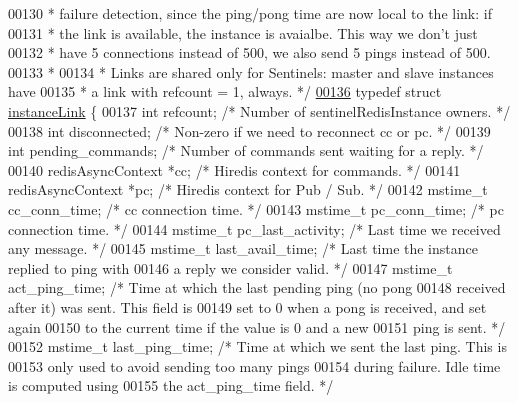 \begin{DoxyCode}
00130 \textcolor{comment}{ * failure detection, since the ping/pong time are now local to the link: if}
00131 \textcolor{comment}{ * the link is available, the instance is avaialbe. This way we don't just}
00132 \textcolor{comment}{ * have 5 connections instead of 500, we also send 5 pings instead of 500.}
00133 \textcolor{comment}{ *}
00134 \textcolor{comment}{ * Links are shared only for Sentinels: master and slave instances have}
00135 \textcolor{comment}{ * a link with refcount = 1, always. */}
\hyperlink{structinstanceLink}{00136} \textcolor{keyword}{typedef} \textcolor{keyword}{struct} \hyperlink{structinstanceLink}{instanceLink} \{
00137     \textcolor{keywordtype}{int} refcount;          \textcolor{comment}{/* Number of sentinelRedisInstance owners. */}
00138     \textcolor{keywordtype}{int} disconnected;      \textcolor{comment}{/* Non-zero if we need to reconnect cc or pc. */}
00139     \textcolor{keywordtype}{int} pending\_commands;  \textcolor{comment}{/* Number of commands sent waiting for a reply. */}
00140     redisAsyncContext *cc; \textcolor{comment}{/* Hiredis context for commands. */}
00141     redisAsyncContext *pc; \textcolor{comment}{/* Hiredis context for Pub / Sub. */}
00142     mstime\_t cc\_conn\_time; \textcolor{comment}{/* cc connection time. */}
00143     mstime\_t pc\_conn\_time; \textcolor{comment}{/* pc connection time. */}
00144     mstime\_t pc\_last\_activity; \textcolor{comment}{/* Last time we received any message. */}
00145     mstime\_t last\_avail\_time; \textcolor{comment}{/* Last time the instance replied to ping with}
00146 \textcolor{comment}{                                 a reply we consider valid. */}
00147     mstime\_t act\_ping\_time;   \textcolor{comment}{/* Time at which the last pending ping (no pong}
00148 \textcolor{comment}{                                 received after it) was sent. This field is}
00149 \textcolor{comment}{                                 set to 0 when a pong is received, and set again}
00150 \textcolor{comment}{                                 to the current time if the value is 0 and a new}
00151 \textcolor{comment}{                                 ping is sent. */}
00152     mstime\_t last\_ping\_time;  \textcolor{comment}{/* Time at which we sent the last ping. This is}
00153 \textcolor{comment}{                                 only used to avoid sending too many pings}
00154 \textcolor{comment}{                                 during failure. Idle time is computed using}
00155 \textcolor{comment}{                                 the act\_ping\_time field. */}

\end{DoxyCode}
